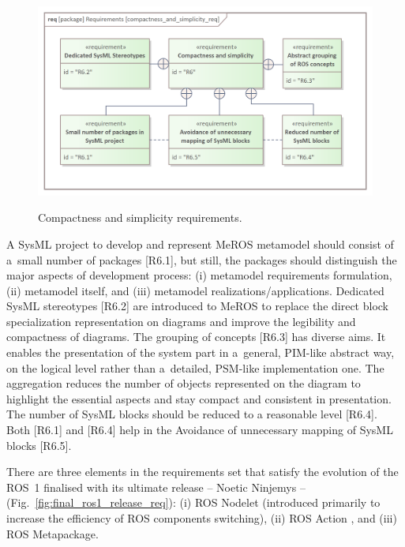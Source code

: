 \documentclass[11pt,oneside,a4paper]{article}
\begin{document}
	\begin{figure}[H]
		\centering
		\begin{center}
			{\includegraphics[scale=0.9]{img/requirement_pkg/compactness_and_simplicity_req.png}}
		\end{center}
		\caption{Compactness and simplicity requirements.} 
		\label{fig:compactness_and_simplicity_req}
	\end{figure}
	
	A SysML project to develop and represent MeROS metamodel should consist of a~small number of packages [R6.1], but still, the packages should distinguish the major aspects of development process: (i) metamodel requirements formulation, (ii) metamodel itself, and (iii) metamodel realizations/applications.
	Dedicated SysML stereotypes [R6.2] are introduced to MeROS to replace the direct block specialization representation on diagrams and improve the legibility and compactness of diagrams.
	The grouping of concepts [R6.3] has diverse aims. It enables the presentation of the system part in a~general, PIM-like abstract way, on the logical level rather than a~detailed, PSM-like implementation one. The aggregation reduces the number of objects represented on the diagram to highlight the essential aspects and stay compact and consistent in presentation.
	The number of SysML blocks should be reduced to a reasonable level [R6.4]. Both [R6.1] and [R6.4] help in the Avoidance of unnecessary mapping of SysML blocks [R6.5].

	There are three elements in the requirements set that satisfy the evolution of the ROS~1  finalised with its ultimate release -- Noetic Ninjemys -- (Fig.~\ref{fig:final_ros1_release_req}): (i) ROS Nodelet  (introduced primarily to increase the efficiency of ROS components switching), (ii) ROS Action , and (iii) ROS Metapackage.
	
\end{document}
